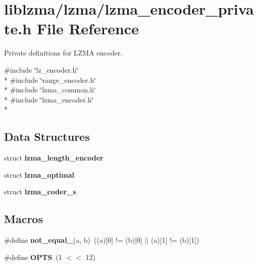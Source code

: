 \section{liblzma/lzma/lzma\-\_\-encoder\-\_\-private.h File Reference}
\label{lzma__encoder__private_8h}


Private definitions for L\-Z\-M\-A encoder.  


{\ttfamily \#include \char`\"{}lz\-\_\-encoder.\-h\char`\"{}}\\*
{\ttfamily \#include \char`\"{}range\-\_\-encoder.\-h\char`\"{}}\\*
{\ttfamily \#include \char`\"{}lzma\-\_\-common.\-h\char`\"{}}\\*
{\ttfamily \#include \char`\"{}lzma\-\_\-encoder.\-h\char`\"{}}\\*
\subsection*{Data Structures}
\begin{DoxyCompactItemize}
\item 
struct {\bf lzma\-\_\-length\-\_\-encoder}
\item 
struct {\bf lzma\-\_\-optimal}
\item 
struct {\bf lzma\-\_\-coder\-\_\-s}
\end{DoxyCompactItemize}
\subsection*{Macros}
\begin{DoxyCompactItemize}
\item 
\#define {\bfseries not\-\_\-equal\-\_}(a, b)~((a)[0] != (b)[0] $|$$|$ (a)[1] != (b)[1])\label{lzma__encoder__private_8h_a9e791f02547e7aa0572e899bba218a3f}

\item 
\#define {\bfseries O\-P\-T\-S}~(1 $<$$<$ 12)\label{lzma__encoder__private_8h_a1e3bf8c87fd72574fee33e7bf0482892}

\end{DoxyCompactItemize}
